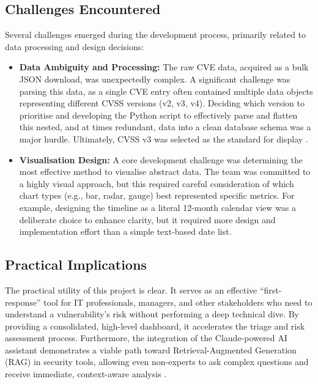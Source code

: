 \documentclass[12pt,a4paper]{article}
\begin{document}
    \subsection{Challenges Encountered}
    Several challenges emerged during the development process, primarily related to data processing and design decisions:
    \begin{itemize}
        \item \textbf{Data Ambiguity and Processing:} The raw CVE data, acquired as a bulk JSON download, was unexpectedly complex. A significant challenge was parsing this data, as a single CVE entry often contained multiple data objects representing different CVSS versions (v2, v3, v4). Deciding which version to prioritise and developing the Python script to effectively parse and flatten this nested, and at times redundant, data into a clean database schema was a major hurdle. Ultimately, CVSS v3 was selected as the standard for display\cite{JIANG2022100209} \cite{Notes_on_CVE_assessment} \cite{proofpoint_Data_Visualization} \cite{apriorit2025}.
        \item \textbf{Visualisation Design:} A core development challenge was determining the most effective method to visualise abstract data. The team was committed to a highly visual approach, but this required careful consideration of which chart types (e.g., bar, radar, gauge) best represented specific metrics. For example, designing the timeline as a literal 12-month calendar view was a deliberate choice to enhance clarity, but it required more design and implementation effort than a simple text-based date list.
    \end{itemize}
    \subsection{Practical Implications}
    The practical utility of this project is clear.
    It serves as an effective ``first-response'' tool for IT professionals, managers, and other stakeholders who need to understand a vulnerability's risk without performing a deep technical dive.
    By providing a consolidated, high-level dashboard, it accelerates the triage and risk assessment process. \cite{10.1145/3491418.3535176} \cite{databahn_From_Noise_to_Knowledge} \cite{10152204}
    Furthermore, the integration of the Claude-powered AI assistant demonstrates a viable path toward Retrieval-Augmented Generation (RAG) in security tools, allowing even non-experts to ask complex questions and receive immediate, context-aware analysis \cite{anthropic_Building_AI_for_cyber_defenders} \cite{bhartiya2025}.
    \clearpage
\end{document}
